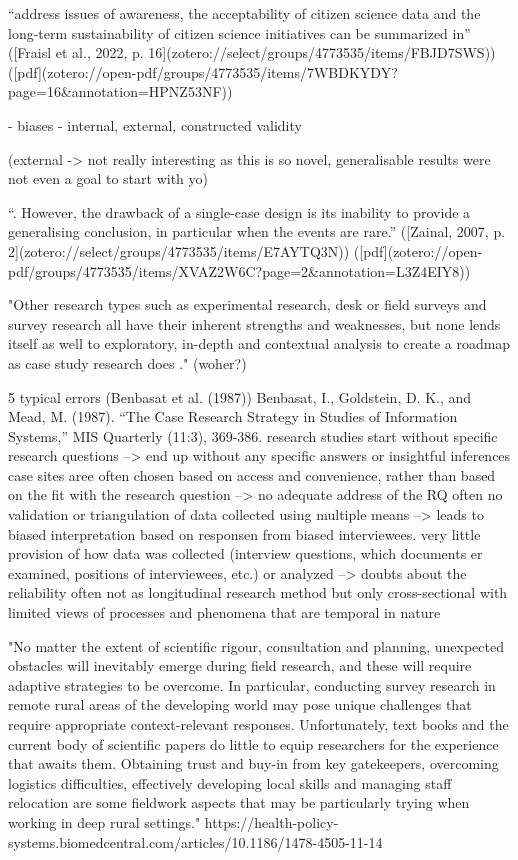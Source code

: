 “address issues of awareness, the acceptability of citizen science data and the long-term sustainability of citizen science initiatives can be summarized in” ([Fraisl et al., 2022, p. 16](zotero://select/groups/4773535/items/FBJD7SWS)) ([pdf](zotero://open-pdf/groups/4773535/items/7WBDKYDY?page=16&annotation=HPNZ53NF))


- biases
- internal, external, constructed validity 

(external -> not really interesting as this is so novel, generalisable results were not even a goal to start with yo)


“. However, the drawback of a single-case design is its inability to provide a generalising conclusion, in particular when the events are rare.” ([Zainal, 2007, p. 2](zotero://select/groups/4773535/items/E7AYTQ3N)) ([pdf](zotero://open-pdf/groups/4773535/items/XVAZ2W6C?page=2&annotation=L3Z4EIY8))

"Other research types such as experimental research, desk or field surveys and survey research all have their inherent strengths and weaknesses, but none lends itself as well to exploratory, in-depth and contextual analysis to create a roadmap as case study research does \autocite{pelzResearchMethodsSocial}." (woher?)

5 typical errors (Benbasat et al. (1987)) Benbasat, I., Goldstein, D. K., and Mead, M. (1987). “The Case Research Strategy in Studies of Information Systems,” MIS Quarterly (11:3), 369-386.
research studies start without specific research questions --> end up without any specific answers or insightful inferences
case sites aree often chosen based on access and convenience, rather than based on the fit with the research question --> no adequate address of the RQ
often no validation or triangulation of data collected using multiple means --> leads to biased interpretation based on responsen from biased interviewees.
very little provision of how data was collected (interview questions, which documents er examined, positions of interviewees, etc.) or analyzed --> doubts about the reliability
often not as longitudinal research method but only cross-sectional with limited views of processes and phenomena that are temporal in nature

"No matter the extent of scientific rigour, consultation and planning, unexpected obstacles will inevitably emerge during field research, and these will require adaptive strategies to be overcome. In particular, conducting survey research in remote rural areas of the developing world may pose unique challenges that require appropriate context-relevant responses. Unfortunately, text books and the current body of scientific papers do little to equip researchers for the experience that awaits them. Obtaining trust and buy-in from key gatekeepers, overcoming logistics difficulties, effectively developing local skills and managing staff relocation are some fieldwork aspects that may be particularly trying when working in deep rural settings."
https://health-policy-systems.biomedcentral.com/articles/10.1186/1478-4505-11-14

